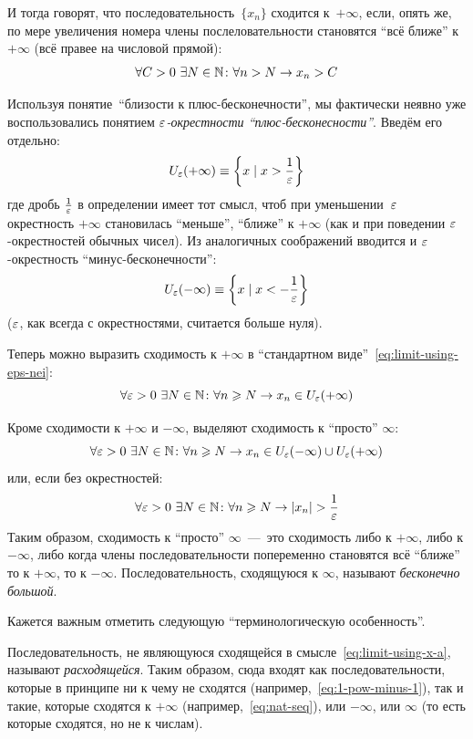 \documentclass[a4paper,12pt]{article}
\begin{document}
  И тогда говорят, что последовательность~$\{x_n\}$ сходится к~${+}\infty$, если, опять же, по мере увеличения номера члены послеловательности становятся ``всё ближе'' к~${+}\infty$ (всё правее на числовой прямой):
  \[
    \forall C > 0\ \exists N \in \mathbb N\colon \forall n > N \to x_n > C
  \]

  Используя понятие~``близости к плюс-бесконечности'', мы фактически неявно уже воспользовались понятием \emph{$\varepsilon$-окрестности ``плюс-бесконесности''}.
  Введём его отдельно:
  \[
    U_{\varepsilon}({+}\infty) \equiv \left\{x \mid x > \frac{1}{\varepsilon}\right\}
  \]
  где дробь $\frac{1}{\varepsilon}$ в определении имеет тот смысл, чтоб при уменьшении~$\varepsilon$ окрестность ${+}\infty$ становилась ``меньше'', ``ближе'' к ${+}\infty$ (как и при поведении $\varepsilon$-окрестностей обычных чисел).
  Из аналогичных соображений вводится и $\varepsilon$-окрестность ``минус-бесконечности'':
  \[
    U_{\varepsilon}({-}\infty) \equiv \left\{x \mid x < -\frac{1}{\varepsilon}\right\}
  \]
  ($\varepsilon$, как всегда с окрестностями, считается больше нуля).

  Теперь можно выразить сходимость к ${+}\infty$ в ``стандартном виде''~\eqref{eq:limit-using-eps-nei}:
  \[
    \forall \varepsilon > 0\ \exists N \in \mathbb N\colon \forall n \geqslant N \to x_n \in U_{\varepsilon}({+}\infty)
  \]

  Кроме сходимости к $+\infty$ и $-\infty$, выделяют сходимость к ``просто'' $\infty$:
  \[
    \forall \varepsilon > 0\ \exists N \in \mathbb N\colon \forall n \geqslant N \to x_n \in U_{\varepsilon}({-}\infty) \cup U_{\varepsilon}({+}\infty)
  \]
  или, если без окрестностей:
  \[
    \forall \varepsilon > 0\ \exists N \in \mathbb N\colon \forall n \geqslant N \to |x_n| > \frac{1}{\varepsilon}
  \]
  Таким образом, сходимость к ``просто'' $\infty$~---~это сходимость либо к $+\infty$, либо к $-\infty$, либо когда члены последовательности попеременно становятся всё ``ближе'' то к $+\infty$, то к $-\infty$.
  Последовательность, сходящуюся к $\infty$, называют \emph{бесконечно большой}.

  \begin{remark}
    Кажется важным отметить следующую ``терминологическую особенность''.
    
    Последовательность, не являющуюся сходящейся в смысле~\eqref{eq:limit-using-x-a}, называют \emph{расходящейся}.
    Таким образом, сюда входят как последовательности, которые в принципе ни к чему не сходятся (например,~\eqref{eq:1-pow-minus-1}), так и такие, которые сходятся к ${+}\infty$ (например,~\eqref{eq:nat-seq}), или ${-}\infty$, или $\infty$ (то есть которые сходятся, но не к числам).
  \end{remark}
\end{document}
